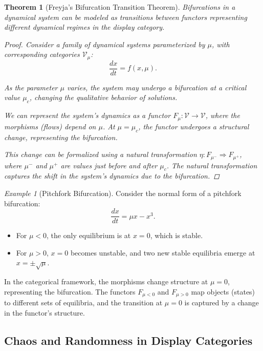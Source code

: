 \documentclass{article}
\newtheorem{theorem}{Theorem}[section]
\theoremstyle{definition}
\theoremstyle{remark}
\newtheorem{example}{Example}
\begin{document}
	\begin{theorem}[Freyja's Bifurcation Transition Theorem]
		Bifurcations in a dynamical system can be modeled as transitions between functors representing different dynamical regimes in the display category.
		
		\begin{proof}
			Consider a family of dynamical systems parameterized by $\mu$, with corresponding categories $\mathcal{V}_\mu$:
			\[
			\frac{dx}{dt} = f(x, \mu).
			\]
			
			As the parameter $\mu$ varies, the system may undergo a bifurcation at a critical value $\mu_c$, changing the qualitative behavior of solutions.
			
			We can represent the system's dynamics as a functor $F_\mu: \mathcal{V} \rightarrow \mathcal{V}$, where the morphisms (flows) depend on $\mu$. At $\mu = \mu_c$, the functor undergoes a structural change, representing the bifurcation.
			
			This change can be formalized using a natural transformation $\eta: F_{\mu^-} \Rightarrow F_{\mu^+}$, where $\mu^-$ and $\mu^+$ are values just before and after $\mu_c$. The natural transformation captures the shift in the system's dynamics due to the bifurcation.
		\end{proof}
	\end{theorem}
	
	\begin{example}[Pitchfork Bifurcation]
		Consider the normal form of a pitchfork bifurcation:
		\[
		\frac{dx}{dt} = \mu x - x^3.
		\]
		
		\begin{itemize}
			\item For $\mu < 0$, the only equilibrium is at $x = 0$, which is stable.
			\item For $\mu > 0$, $x = 0$ becomes unstable, and two new stable equilibria emerge at $x = \pm \sqrt{\mu}$.
		\end{itemize}
		
		In the categorical framework, the morphisms change structure at $\mu = 0$, representing the bifurcation. The functors $F_{\mu<0}$ and $F_{\mu>0}$ map objects (states) to different sets of equilibria, and the transition at $\mu = 0$ is captured by a change in the functor's structure.
	\end{example}
	
	\subsection{Chaos and Randomness in Display Categories}
	
\end{document}
